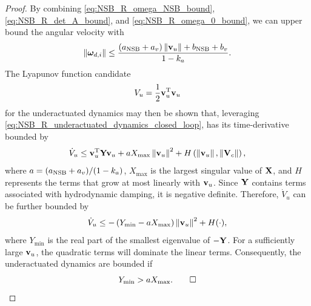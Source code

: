 \begin{proof}
    By combining \eqref{eq:NSB_R_omega_NSB_bound}, \eqref{eq:NSB_R_det_A_bound}, and \eqref{eq:NSB_R_omega_0_bound}, we can upper bound the angular velocity with 
    \begin{equation}
        \left\|\bm{\omega}_{d, i}\right\| \leq \frac{\left(a_{\rm NSB} + a_v\right)\left\|\mathbf{v}_u\right\| + b_{\rm NSB} + b_v}{1 - k_a} .
    \end{equation}
    The Lyapunov function candidate 
    \begin{equation}
        V_u = \frac{1}{2} \mathbf{v}_u^{\mathrm{T}}\mathbf{v}_u
    \end{equation}
    for the underactuated dynamics may then be shown that, leveraging \eqref{eq:NSB_R_underactuated_dynamics_closed_loop}, has its time-derivative bounded by 
    \begin{equation}
        \dot{V}_u \leq \mathbf{v}_u^{\mathrm{T}}\mathbf{Y}\mathbf{v}_u + aX_{\max}\left\|\mathbf{v}_u\right\|^2 + H\left(\left\|\mathbf{v}_u\right\|, \left\|\mathbf{V}_c\right\|\right),
    \end{equation}
    where $a = (a_{\rm NSB} + a_v)/(1 - k_a)$, $X_{\max}$ is the largest singular value of $\mathbf{X}$, and $H$ represents the terms that grow at most linearly with $\mathbf{v}_u$.
    Since $\mathbf{Y}$ contains terms associated with hydrodynamic damping, it is negative definite.
    Therefore, $\dot{V}_u$ can be further bounded by 
    \begin{equation}
        \dot{V}_u \leq -\left(Y_{\min} - aX_{\max}\right)\left\|\mathbf{v}_u\right\|^2 + H(\cdot),
    \end{equation}
    where $Y_{\min}$ is the real part of the smallest eigenvalue of $-\mathbf{Y}$.
    For a sufficiently large $\mathbf{v}_u$, the quadratic terms will dominate the linear terms.
    Consequently, the underactuated dynamics are bounded if 
    \begin{equation}
        Y_{\min} > aX_{\max}. \label{eq:NSB_R_boudedness_condition}
        \qed
    \end{equation}
    
\end{proof}

